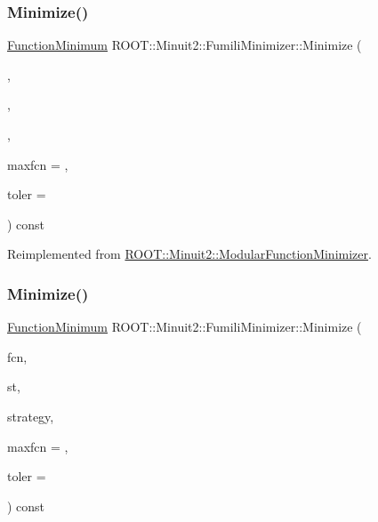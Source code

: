 \subsubsection{\texorpdfstring{Minimize()}{Minimize()}\hspace{0.1cm}{\footnotesize\ttfamily [1/33]}}
{\footnotesize\ttfamily \mbox{\hyperlink{classROOT_1_1Minuit2_1_1FunctionMinimum}{Function\+Minimum}} R\+O\+O\+T\+::\+Minuit2\+::\+Fumili\+Minimizer\+::\+Minimize (\begin{DoxyParamCaption}\item[{const \mbox{\hyperlink{classROOT_1_1Minuit2_1_1FCNBase}{F\+C\+N\+Base}} \&}]{,  }\item[{const \mbox{\hyperlink{classROOT_1_1Minuit2_1_1MnUserParameterState}{Mn\+User\+Parameter\+State}} \&}]{,  }\item[{const \mbox{\hyperlink{classROOT_1_1Minuit2_1_1MnStrategy}{Mn\+Strategy}} \&}]{,  }\item[{unsigned int}]{maxfcn = {},  }\item[{double}]{toler = {} }\end{DoxyParamCaption}) const\hspace{0.3cm}{\ttfamily [virtual]}}



Reimplemented from \mbox{\hyperlink{classROOT_1_1Minuit2_1_1ModularFunctionMinimizer_a1ae6ed90bc87c3db98388f3d26980a51}{R\+O\+O\+T\+::\+Minuit2\+::\+Modular\+Function\+Minimizer}}.

\mbox{\label{classROOT_1_1Minuit2_1_1FumiliMinimizer_a3da0ec7b2ba7f876809f72d2f3054eec}} 
\subsubsection{\texorpdfstring{Minimize()}{Minimize()}\hspace{0.1cm}{\footnotesize\ttfamily [2/33]}}
{\footnotesize\ttfamily \mbox{\hyperlink{classROOT_1_1Minuit2_1_1FunctionMinimum}{Function\+Minimum}} R\+O\+O\+T\+::\+Minuit2\+::\+Fumili\+Minimizer\+::\+Minimize (\begin{DoxyParamCaption}\item[{const \mbox{\hyperlink{classROOT_1_1Minuit2_1_1FCNBase}{F\+C\+N\+Base}} \&}]{fcn,  }\item[{const \mbox{\hyperlink{classROOT_1_1Minuit2_1_1MnUserParameterState}{Mn\+User\+Parameter\+State}} \&}]{st,  }\item[{const \mbox{\hyperlink{classROOT_1_1Minuit2_1_1MnStrategy}{Mn\+Strategy}} \&}]{strategy,  }\item[{unsigned int}]{maxfcn = {},  }\item[{double}]{toler = {} }\end{DoxyParamCaption}) const\hspace{0.3cm}{\ttfamily [virtual]}}



